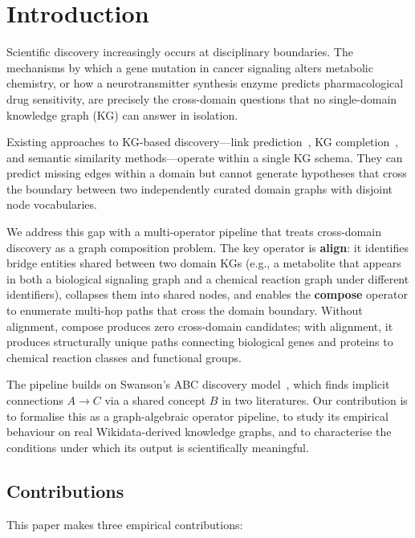 \section{Introduction}
\label{sec:intro}

Scientific discovery increasingly occurs at disciplinary boundaries.
The mechanisms by which a gene mutation in cancer signaling alters metabolic chemistry,
or how a neurotransmitter synthesis enzyme predicts pharmacological drug sensitivity,
are precisely the cross-domain questions that no single-domain knowledge graph (KG)
can answer in isolation.

Existing approaches to KG-based discovery---link prediction~\cite{TODO-TransE,TODO-RotatE},
KG completion~\cite{TODO-ComplEx}, and semantic similarity methods---operate within
a single KG schema.
They can predict missing edges within a domain but cannot generate hypotheses that
cross the boundary between two independently curated domain graphs with disjoint
node vocabularies.

We address this gap with a multi-operator pipeline that treats cross-domain discovery
as a graph composition problem.
The key operator is \textbf{align}: it identifies bridge entities shared between two
domain KGs (e.g., a metabolite that appears in both a biological signaling graph and
a chemical reaction graph under different identifiers), collapses them into shared
nodes, and enables the \textbf{compose} operator to enumerate multi-hop paths that
cross the domain boundary.
Without alignment, compose produces zero cross-domain candidates; with alignment,
it produces structurally unique paths connecting biological genes and proteins
to chemical reaction classes and functional groups.

The pipeline builds on Swanson's ABC discovery model~\cite{swanson1986fish}, which
finds implicit connections $A \to C$ via a shared concept $B$ in two literatures.
Our contribution is to formalise this as a graph-algebraic operator pipeline,
to study its empirical behaviour on real Wikidata-derived knowledge graphs, and to
characterise the conditions under which its output is scientifically meaningful.

\subsection*{Contributions}

This paper makes three empirical contributions:


